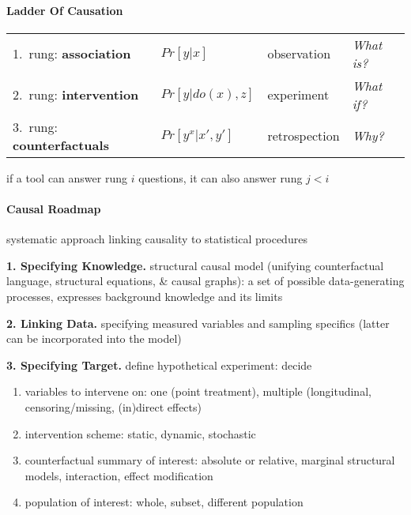\documentclass[8pt,twoside]{extarticle}
\begin{document}
\begin{multicols}{2}

\paragraph{Ladder Of Causation} \citep{pearl2019seven}

\noindent
\hspace{-0.9em}
\begin{minipage}{\textwidth}
\begin{tabular}{l@{\hskip 5pt} l@{\hskip 5pt}l@{\hskip 5pt}l@{\hskip 5pt}}
1.\ rung: \textbf{association} & $Pr\left[y|x\right]$ & observation & \textit{What is?} \\
2.\ rung: \textbf{intervention} & $Pr\left[y|do(x),z\right]$ & experiment & \textit{What if?} \\
3.\ rung: \textbf{counterfactuals} & $Pr\left[y^x|x',y'\right]$ & retrospection & \textit{Why?}
\end{tabular}
\end{minipage}
if a tool can answer rung $i$ questions, it can also answer rung $j<i$


\paragraph{Causal Roadmap} \citep{petersen2014causal} 
systematic approach linking causality to statistical procedures

\noindent \textbf{1. Specifying Knowledge.} structural causal model (unifying counterfactual language, structural equations, \& causal graphs): a set of possible data-generating processes, expresses background knowledge and its limits

\noindent \textbf{2. Linking Data.} specifying measured variables and sampling specifics (latter can be incorporated into the model)

\noindent \textbf{3. Specifying Target.} define hypothetical experiment: decide
\noindent\begin{enumerate}[itemsep=0em, topsep=0pt, partopsep=0pt,parsep=0pt]
\setlength{\itemsep}{0pt}%
\setlength{\parskip}{0pt}
\item variables to intervene on: one (point treatment), multiple (longitudinal, censoring/missing, (in)direct effects)
\item intervention scheme: static, dynamic, stochastic
\item counterfactual summary of interest: absolute or relative, marginal structural models, interaction, effect modification
\item population of interest: whole, subset, different population
\end{enumerate}


\end{multicols}
\end{document}
